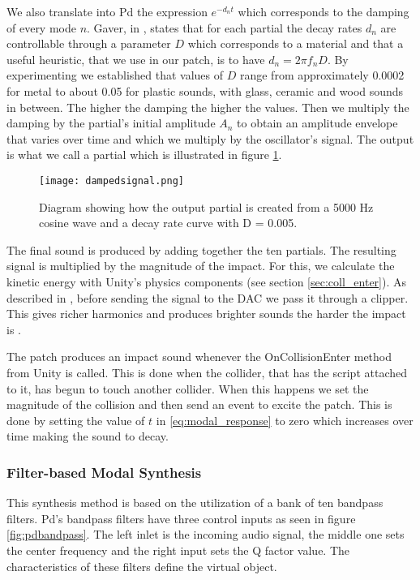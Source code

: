 We also translate into Pd the expression $e^{-d_n t}$ which corresponds to the damping of every mode $n$. Gaver, in \cite{gaver1993we}, states that for each partial the decay rates $d_n$ are controllable through a parameter $D$ which corresponds to a material and that a useful heuristic, that we use in our patch, is to have $d_n = 2 \pi f_nD$. By experimenting we established that values of $D$ range from approximately 0.0002 for metal to about 0.05 for plastic sounds, with glass, ceramic and wood sounds in between. The higher the damping the higher the values. Then we multiply the damping by the partial's initial amplitude $A_n$ to obtain an amplitude envelope that varies over time and which we multiply by the oscillator's signal. The output is what we call a partial which is illustrated in figure \ref{fig:dampedsignal}. 

\begin{figure}[H]
  \centering
    \texttt{[image: dampedsignal.png]}
      \caption{Diagram showing how the output partial is created from a 5000 Hz cosine wave and a decay rate curve with D = 0.005.}
      \label{fig:dampedsignal}
\end{figure}

The final sound is produced by adding together the ten partials. The resulting signal is multiplied by the magnitude of the impact. For this, we calculate the kinetic energy with Unity\textsuperscript{\textregistered}'s physics components (see section \ref{sec:coll_enter}). As described in \cite{farnell2010designing}, before sending the signal to the DAC we pass it through a clipper. This gives richer harmonics and produces brighter sounds the harder the impact is \cite{aramaki2009thinking}.

The patch produces an impact sound whenever the OnCollisionEnter method from Unity\textsuperscript{\textregistered} is called. This is done when the collider, that has the script attached to it, has begun to touch another collider. When this happens we set the magnitude of the collision and then send an event to excite the patch. This is done by setting the value of $t$ in \ref{eq:modal_response} to zero which increases over time making the sound to decay.

\subsubsection{Filter-based Modal Synthesis}

This synthesis method is based on the utilization of a bank of ten bandpass filters. Pd's bandpass filters have three control inputs as seen in figure \ref{fig:pdbandpass}. The left inlet is the incoming audio signal, the middle one sets the center frequency and the right input sets the Q factor value. The characteristics of these filters define the virtual object.

